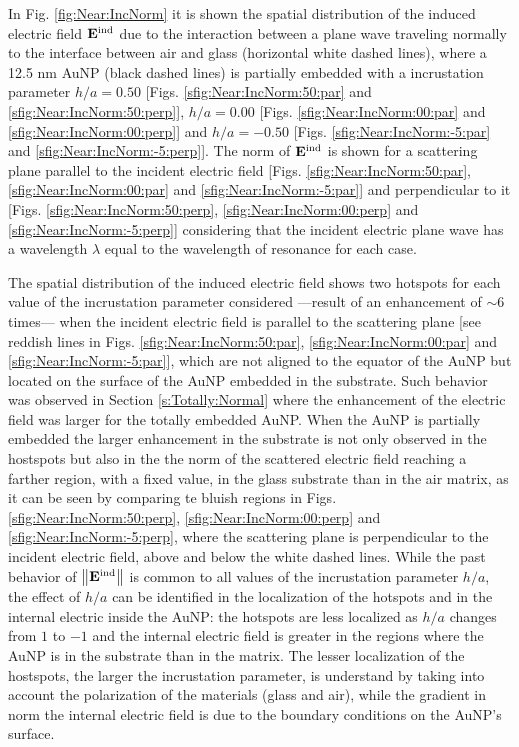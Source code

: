 In Fig. \ref{fig:Near:IncNorm} it is shown the spatial distribution of the induced electric field $\vb{E}^\text{ind}$ due to the interaction between a plane wave traveling normally to the interface between air and glass (horizontal white dashed lines), where a 12.5 nm AuNP (black dashed lines) is partially embedded with a incrustation parameter $h/a = 0.50$ [Figs. \ref{sfig:Near:IncNorm:50:par} and \ref{sfig:Near:IncNorm:50:perp}], $h/a = 0.00$ [Figs. \ref{sfig:Near:IncNorm:00:par} and \ref{sfig:Near:IncNorm:00:perp}] and $h/a = - 0.50$ [Figs. \ref{sfig:Near:IncNorm:-5:par} and \ref{sfig:Near:IncNorm:-5:perp}]. The norm of $\vb{E}^\text{ind}$ is shown for a scattering plane parallel to the incident electric field [Figs. \ref{sfig:Near:IncNorm:50:par}, \ref{sfig:Near:IncNorm:00:par} and \ref{sfig:Near:IncNorm:-5:par}] and perpendicular to it [Figs. \ref{sfig:Near:IncNorm:50:perp}, \ref{sfig:Near:IncNorm:00:perp} and \ref{sfig:Near:IncNorm:-5:perp}] considering that the incident electric plane wave has a wavelength $\lambda$ equal to the wavelength of resonance for each case.

The spatial distribution of the induced electric field shows two hotspots for each value of the incrustation parameter considered ---result of an enhancement of $\sim 6$ times--- when the incident electric field is parallel to the scattering plane [see reddish lines in Figs.  \ref{sfig:Near:IncNorm:50:par}, \ref{sfig:Near:IncNorm:00:par} and \ref{sfig:Near:IncNorm:-5:par}], which are not aligned to the equator of the AuNP but located on the surface of the AuNP embedded in the substrate. Such behavior was observed in Section \ref{s:Totally:Normal} where the enhancement of the electric field was larger for the totally embedded AuNP. When the AuNP is partially  embedded the larger enhancement in the substrate is not only observed in the hostspots but also in the the norm of the scattered electric field reaching a farther region, with a fixed value, in the glass substrate than in the air matrix, as it can be seen by comparing te bluish regions in Figs. \ref{sfig:Near:IncNorm:50:perp}, \ref{sfig:Near:IncNorm:00:perp} and \ref{sfig:Near:IncNorm:-5:perp}, where the scattering plane is perpendicular to the incident electric field, above and below the white dashed lines. While the past behavior of $\norm{ \vb{E}^\text{ind}}$ is common to all values of the incrustation parameter $h/a$, the effect of $h/a$ can be identified in the localization of the hotspots and in the internal electric inside the AuNP: the hotspots are less localized as $h/a$ changes from $1$ to $-1$ and the internal electric field is greater in the regions where the AuNP is in the substrate than in the matrix. The lesser localization of the hostspots, the larger the incrustation parameter, is understand by taking into account the polarization of the materials (glass and air), while the gradient in norm the internal electric field is due to the boundary conditions on the AuNP's surface.

